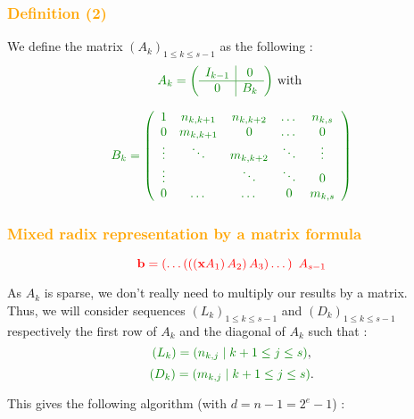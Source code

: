 \begin{frame}[fragile]
\frametitle{\textbf{\textcolor{orange}{Definition (2)}}}

\begin{Definition}[matrix $A$]
We define the matrix $(A_k)_{1 \leq k \leq s-1}$ as the following :
$$\textcolor{darkgreen}{A_k = \left(
  \begin{array}{c|c}
     I_{k-1}  & 0    \\ \hline
     0        & B_k
  \end{array} \right)} \mbox{ with } $$

$$\textcolor{darkgreen}{B_k = \left(
  \begin{array}{c c c c c}
     1      & n_{k,k+1} & n_{k,k+2} & \dots  & n_{k,s} \\
     0      & m_{k,k+1} & 0         & \dots  & 0       \\
     \vdots & \ddots    & m_{k,k+2} & \ddots & \vdots  \\
     \vdots &           & \ddots    & \ddots & 0       \\
     0      & \dots     & \dots     & 0      & m_{k,s}
  \end{array} \right)}
$$
\end{Definition}

\end{frame}

\begin{frame}[fragile]
\frametitle{\textbf{\textcolor{orange}{Mixed radix representation by a matrix formula}}}

\begin{Theorem}
$$\textcolor{red}{\textbf{b} = \left(\dots\left(\left(\left( \textbf{x}A_1 \right)A_2\right)A_3\right)\dots\right)\ A_{s-1}}$$
\end{Theorem}

\begin{Definition}
As $A_k$ is sparse, we don't really need to multiply our results by a matrix.\\
Thus, we will consider sequences $(L_k)_{1 \leq k \leq s-1}$ and $(D_k)_{1 \leq k \leq s-1}$ respectively the first row of $A_k$ and the diagonal of $A_k$ such that :
$$\textcolor{darkgreen}{(L_k) = (n_{k,j} \; | \; k+1 \leq j \leq s)},$$
$$\textcolor{darkgreen}{(D_k) = (m_{k,j} \; | \; k+1 \leq j \leq s)}.$$
\end{Definition} 

This gives the following algorithm (with $d=n-1 = 2^e-1$) :

\end{frame}


